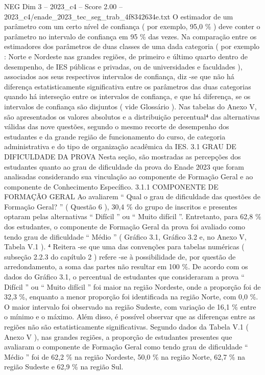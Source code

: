 \begin{textsample}{NEG Dim 3 – 2023\_c4 – Score 2.00 – 2023\_c4/enade\_2023\_tec\_seg\_trab\_4f8342634e.txt}
O estimador de um parâmetro com um certo nível de confiança ( por exemplo, 95,0 \% ) deve conter o parâmetro no intervalo de confiança em 95 \% das vezes.
Na comparação entre os estimadores dos parâmetros de duas classes de uma dada categoria ( por exemplo : Norte e Nordeste nas grandes regiões, de primeiro e último quarto dentro de desempenho, de IES públicas e privadas, ou de universidades e faculdades ), associados aos seus respectivos intervalos de confiança, diz -se que não há diferença estatisticamente significativa entre os parâmetros das duas categorias quando há interseção entre os intervalos de confiança, e que há diferença, se os intervalos de confiança são disjuntos ( vide Glossário ).
Nas tabelas do Anexo V, são apresentados os valores absolutos e a distribuição percentual⁴ das alternativas válidas das nove questões, segundo o mesmo recorte de desempenho dos estudantes e da grande região de funcionamento do curso, de categoria administrativa e do tipo de organização acadêmica da IES. 3.1 GRAU DE DIFICULDADE DA PROVA Nesta seção, são mostradas as percepções dos estudantes quanto ao grau de dificuldade da prova do Enade 2023 que foram analisadas considerando sua vinculação ao componente de Formação Geral e ao componente de Conhecimento Específico. 3.1.1 COMPONENTE DE FORMAÇÃO GERAL Ao avaliarem “ Qual o grau de dificuldade das questões de Formação Geral? ” ( Questão 6 ), 30,4 \% do grupo de inscritos e presentes optaram pelas alternativas “ Difícil ” ou “ Muito difícil ”.
Entretanto, para 62,8 \% dos estudantes, o componente de Formação Geral da prova foi avaliado como tendo grau de dificuldade “ Médio ” ( Gráfico 3.1, Gráfico 3.2 e, no Anexo V, Tabela V.1 ). ⁴ Reitera -se que uma das convenções para tabelas numéricas ( subseção 2.2.3 do capítulo 2 ) refere -se à possibilidade de, por questão de arredondamento, a soma das partes não resultar em 100 \%.
De acordo com os dados do Gráfico 3.1, o percentual de estudantes que consideraram a prova “ Difícil ” ou “ Muito difícil ” foi maior na região Nordeste, onde a proporção foi de 32,3 \%, enquanto a menor proporção foi identificada na região Norte, com 0,0 \%.
O maior intervalo foi observado na região Sudeste, com variação de 16,1 \% entre o mínimo e o máximo.
Além disso, é possível observar que as diferenças entre as regiões não são estatisticamente significativas.
Segundo dados da Tabela V.1 ( Anexo V ), nas grandes regiões, a proporção de estudantes presentes que avaliaram o componente de Formação Geral como tendo grau de dificuldade “ Médio ” foi de 62,2 \% na região Nordeste, 50,0 \% na região Norte, 62,7 \% na região Sudeste e 62,9 \% na região Sul.

\end{textsample}
